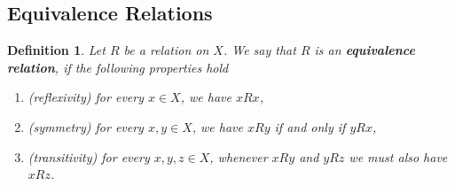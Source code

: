 \documentclass[12pt]{report}
\theoremstyle{plain}
\newtheorem{defn}[thm]{Definition}
\begin{document}
\subsection{Equivalence Relations}

\begin{defn}
Let $R$ be a relation on $X$. We say that $R$ is an \textbf{equivalence
relation}, if the following properties hold
\begin{enumerate}
\item(\textit{reflexivity})
  for every $x \in X$, we have $xRx$,
\item(\textit{symmetry})
  for every $x, y \in X$, we have $xRy$ if and only if $yRx$,
\item(\textit{transitivity})
  for every $x, y, z \in X$, whenever $xRy$ and $yRz$ we must also
  have $xRz$.
\end{enumerate}
\end{defn}

%
%
\printindex
\end{document}
